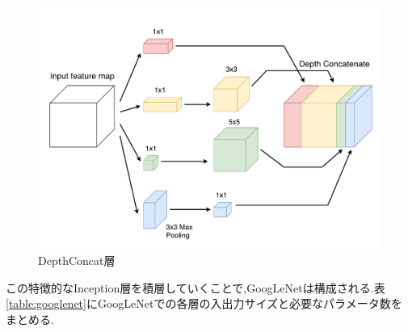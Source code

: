 {\begin{figure}[h]
  \centering
  \includegraphics[scale=0.5]{./chap2/fig/depthconcat.pdf}
  \caption{DepthConcat層}
  \label{fig:depthconcat}
\end{figure}

この特徴的なInception層を積層していくことで,GoogLeNetは構成される.表\ref{table:googlenet}にGoogLeNetでの各層の入出力サイズと必要なパラメータ数をまとめる.

}
